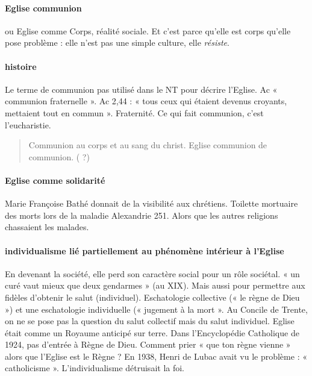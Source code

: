 \paragraph{Eglise communion} ou Eglise comme Corps, réalité sociale. Et c’est parce qu’elle est corps qu’elle pose problème : elle n’est pas une simple culture, elle \textit{résiste}.

\paragraph{histoire} Le terme de communion pas utilisé dans le NT pour décrire l’Eglise. Ac « communion fraternelle ». Ac 2,44 : « tous ceux qui étaient devenus croyants, mettaient tout en commun ». Fraternité. Ce qui fait communion, c’est l’eucharistie.
\begin{quote}
Communion au corps et au sang du christ. Eglise communion de communion.
( ?)
\end{quote}

\paragraph{Eglise comme solidarité} Marie Françoise Bathé donnait de la visibilité aux chrétiens. Toilette mortuaire des morts lors de la maladie Alexandrie 251. Alors que les autres religions chassaient les malades.

\paragraph{individualisme lié partiellement au phénomène intérieur à l’Eglise} En devenant la société, elle perd son caractère social pour un rôle sociétal. « un curé vaut mieux que deux gendarmes » (au XIX). Mais aussi pour permettre aux fidèles d’obtenir le salut (individuel). Eschatologie collective (« le règne de Dieu ») et une eschatologie individuelle (« jugement à la mort ».
Au Concile de Trente, on ne se pose pas la question du salut collectif mais du salut individuel. Eglise était comme un Royaume anticipé sur terre. Dans l’Encyclopédie Catholique de 1924, pas d’entrée à Règne de Dieu. Comment prier « que ton règne vienne » alors que l’Eglise est le Règne ? 
En 1938, Henri de Lubac avait vu le problème : « catholicisme ». L’individualisme détruisait la foi. 

